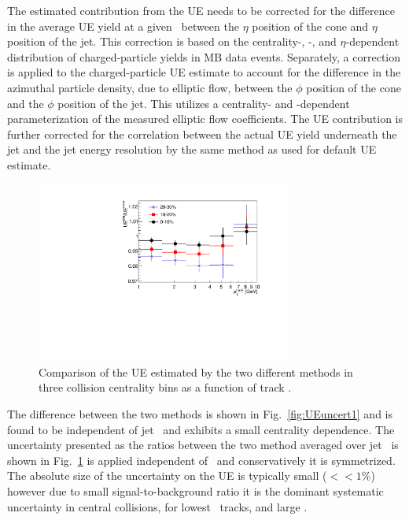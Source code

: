 The estimated contribution from the UE needs to be corrected for the difference in the average UE yield at a given \pttrk\ between the $\eta$ position of the cone and $\eta$ position of the jet. This correction is based on the centrality-, \pttrk-, and $\eta$-dependent distribution of charged-particle yields in MB
data events. Separately, a correction is applied to the charged-particle UE estimate to account for the difference in the azimuthal particle density, due to elliptic flow, between the $\phi$ position of the cone and the $\phi$ position of the jet. This  utilizes a centrality- and \pttrk-dependent parameterization of the measured elliptic flow coefficients. The UE contribution is further corrected for the correlation between the actual UE yield underneath the jet and the jet energy resolution by the same method as used for default UE estimate.

\begin{figure}[h]
    \centerline{
       \includegraphics[width=0.75\textwidth]{figures_systematics/UE_uncert}
    }
    \caption{Comparison of the UE estimated by the two different methods in three collision centrality bins as a function of track \pT.}
    \label{fig:UEuncert2}
 \end{figure}

The difference between the two methods is shown in Fig.~\ref{fig:UEuncert1} and is found to be independent of jet \pT\ and exhibits a small centrality dependence. The uncertainty presented as the ratios between the two method averaged over jet \pT\ is shown in Fig.~\ref{fig:UEuncert2} is applied independent of \rvar\ and conservatively it is symmetrized. The absolute size of the uncertainty on the UE is typically small ($<<1$\%) however due to small signal-to-background ratio it is the dominant systematic uncertainty in central collisions, for lowest \pT\ tracks, and large \rvar.

